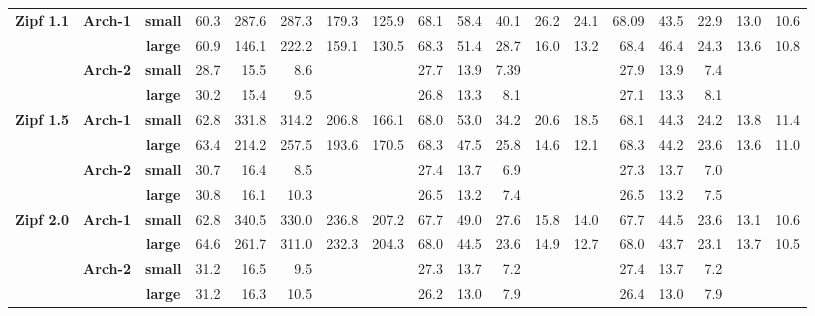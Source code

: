 \documentclass[10pt, conference, compsocconf]{IEEEtran}
\begin{document}
\begin{table}[]
{{\begin{tabular}{ccc||rrrrr|rrrrr|rrrrr}
\multicolumn{1}{c}{\multirow{4}{*}{\textbf{Zipf 1.1}}} 
&\multirow{2}{*}{\textbf{Arch-1}} & \textbf{small}  & 60.3  & 287.6  & 287.3  & 179.3  & 125.9 & 68.1  & 58.4  & 40.1  & 26.2  & 24.1  & 68.09  & 43.5  & 22.9    & 13.0  & 10.6 \\
&& \textbf{large} & 60.9  & 146.1  & 222.2  & 159.1  & 130.5  & 68.3  & 51.4  & 28.7  & 16.0& 13.2&68.4&46.4&24.3&13.6& 10.8 \\ \cline{2-18}
&\multirow{2}{*}{\textbf{Arch-2}}  & \textbf{small}  & 28.7  & 15.5   & 8.6   &        &       & 27.7  & 13.9  & 7.39  &       &       & 27.9  & 13.9  & 7.4  &       &      \\
&& \textbf{large} & 30.2 & 15.4   & 9.5   &        &       & 26.8  & 13.3  & 8.1  &       &       & 27.1  & 13.3  & 8.1  &       &  \\ \hline 

\multicolumn{1}{c}{\multirow{4}{*}{\textbf{Zipf 1.5}}} 
&\multirow{2}{*}{\textbf{Arch-1}} & \textbf{small}  & 62.8  & 331.8  & 314.2  & 206.8  & 166.1 & 68.0  & 53.0  & 34.2  & 20.6  & 18.5  & 68.1  & 44.3  & 24.2    & 13.8  & 11.4 \\
&& \textbf{large} & 63.4  & 214.2  & 257.5  & 193.6  & 170.5  & 68.3  & 47.5  & 25.8  & 14.6& 12.1&68.3&44.2&23.6&13.6& 11.0 \\ \cline{2-18}
&\multirow{2}{*}{\textbf{Arch-2}}  & \textbf{small}  & 30.7  & 16.4   & 8.5   &        &       & 27.4  & 13.7  & 6.9  &       &       & 27.3  & 13.7  & 7.0  &       &      \\
&& \textbf{large} & 30.8 & 16.1   & 10.3   &        &       & 26.5  & 13.2  & 7.4  &       &       & 26.5  & 13.2  & 7.5  &       &  \\ \hline 

\multicolumn{1}{c}{\multirow{4}{*}{\textbf{Zipf 2.0}}} 
&\multirow{2}{*}{\textbf{Arch-1}} & \textbf{small}  & 62.8  & 340.5  & 330.0  & 236.8  & 207.2 & 67.7  & 49.0  & 27.6  & 15.8  & 14.0  & 67.7  & 44.5  & 23.6    & 13.1  & 10.6 \\
&& \textbf{large} & 64.6  & 261.7  & 311.0  & 232.3  & 204.3  & 68.0  & 44.5  & 23.6  & 14.9& 12.7&68.0&43.7&23.1&13.7& 10.5 \\ \cline{2-18}
&\multirow{2}{*}{\textbf{Arch-2}}  & \textbf{small}  & 31.2  & 16.5   & 9.5   &        &       & 27.3  & 13.7  & 7.2  &       &       & 27.4  & 13.7  & 7.2  &       &      \\
&& \textbf{large} & 31.2 & 16.3   & 10.5   &        &       & 26.2  & 13.0  & 7.9  &       &       & 26.4  & 13.0  & 7.9  &       &  \\ \hline 


\end{tabular}}}
\end{table}
\end{document}
